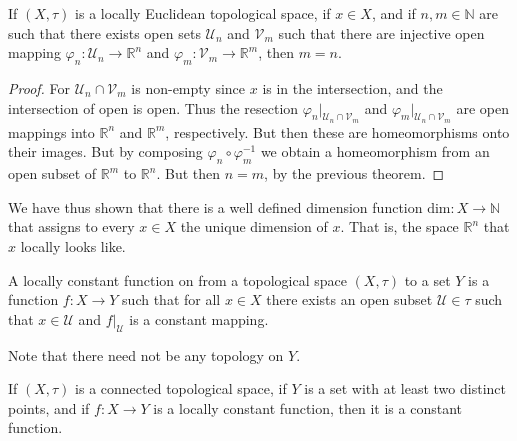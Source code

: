 \documentclass{article}                                                        %
\begin{document}
        \begin{theorem}
            If $(X,\tau)$ is a locally Euclidean topological space, if
            $x\in{X}$, and if $n,m\in\mathbb{N}$ are such that there exists
            open sets $\mathcal{U}_{n}$ and $\mathcal{V}_{m}$ such that there
            are injective open mapping
            $\varphi_{n}:\mathcal{U}_{n}\rightarrow\mathbb{R}^{n}$ and
            $\varphi_{m}:\mathcal{V}_{m}\rightarrow\mathbb{R}^{m}$, then $m=n$.
        \end{theorem}
        \begin{proof} 
            For $\mathcal{U}_{n}\cap\mathcal{V}_{m}$ is non-empty since $x$ is
            in the intersection, and the intersection of open is open. Thus the
            resection $\varphi_{n}|_{\mathcal{U}_{n}\cap\mathcal{V}_{m}}$ and
            $\varphi_{m}|_{\mathcal{U}_{n}\cap\mathcal{V}_{m}}$ are open
            mappings into $\mathbb{R}^{n}$ and $\mathbb{R}^{m}$, respectively.
            But then these are homeomorphisms onto their images. But by
            composing $\varphi_{n}\circ\varphi_{m}^{\minus{1}}$ we obtain a
            homeomorphism from an open subset of $\mathbb{R}^{m}$ to
            $\mathbb{R}^{n}$. But then $n=m$, by the previous theorem.
        \end{proof}
        We have thus shown that there is a well defined dimension function
        $\textrm{dim}:X\rightarrow\mathbb{N}$ that assigns to every $x\in{X}$
        the unique dimension of $x$. That is, the space $\mathbb{R}^{n}$ that
        $x$ locally looks like.
        \begin{definition}
            A locally constant function on from a topological space $(X,\tau)$
            to a set $Y$ is a function $f:X\rightarrow{Y}$ such that for all
            $x\in{X}$ there exists an open subset $\mathcal{U}\in\tau$ such that
            $x\in\mathcal{U}$ and $f|_{\mathcal{U}}$ is a constant mapping.
        \end{definition}
        Note that there need not be any topology on $Y$.
        \begin{theorem}
            If $(X,\tau)$ is a connected topological space, if $Y$ is a set with
            at least two distinct points, and if $f:X\rightarrow{Y}$ is a
            locally constant function, then it is a constant function.
        \end{theorem}
\end{document}
